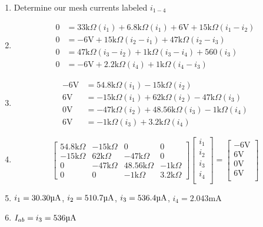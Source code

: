 \documentclass[12pt]{article}
\def\k{\mathrm{k}}
\def\V{\mathrm{V}}
\def\A{\mathrm{A}}
\def\m{\mathrm{m}}
\def\u{\textrm{\textmu}}
\begin{document}
\begin{enumerate}
	\item Determine our mesh currents labeled $i_{1-4}$
	\item \begin{align*}
		      0 & =33\k\Omega(i_1)+6.8\k\Omega(i_1)+6\V+15\k\Omega(i_1-i_2) \\
		      0 & =-6\V+15\k\Omega(i_2-i_1)+47\k\Omega(i_2-i_3)             \\
		      0 & =47\k\Omega(i_3-i_2)+1\k\Omega(i_3-i_4)+560(i_3)          \\
		      0 & =-6\V+2.2\k\Omega(i_4)+1\k\Omega(i_4-i_3)
	      \end{align*}
	\item \begin{align*}
		      -6\V & =54.8\k\Omega(i_1)-15\k\Omega(i_2)                  \\
		      6\V  & =-15\k\Omega(i_1)+62\k\Omega(i_2)-47\k\Omega(i_3)   \\
		      0\V  & =-47\k\Omega(i_2)+48.56\k\Omega(i_3)-1\k\Omega(i_4) \\
		      6\V  & =-1\k\Omega(i_3)+3.2\k\Omega(i_4)
	      \end{align*}
	\item \[
		      \begin{bmatrix}
			      54.8\k\Omega & -15\k\Omega & 0             & 0           \\
			      -15\k\Omega  & 62\k\Omega  & -47\k\Omega   & 0           \\
			      0            & -47\k\Omega & 48.56\k\Omega & -1\k\Omega  \\
			      0            & 0           & -1\k\Omega    & 3.2\k\Omega
		      \end{bmatrix}
		      \begin{bmatrix}
			      i_1 \\
			      i_2 \\
			      i_3 \\
			      i_4 \\
		      \end{bmatrix}
		      =
		      \begin{bmatrix}
			      -6\V \\
			      6\V  \\
			      0\V  \\
			      6\V  \\
		      \end{bmatrix}
	      \]
	\item $i_1=30.30\u\A$, $i_2=510.7\u\A$, $i_3=536.4\u\A$, $i_4=2.043\m\A$
	\item $I_{ab}=i_3=536\u\A$
\end{enumerate}
\end{document}
